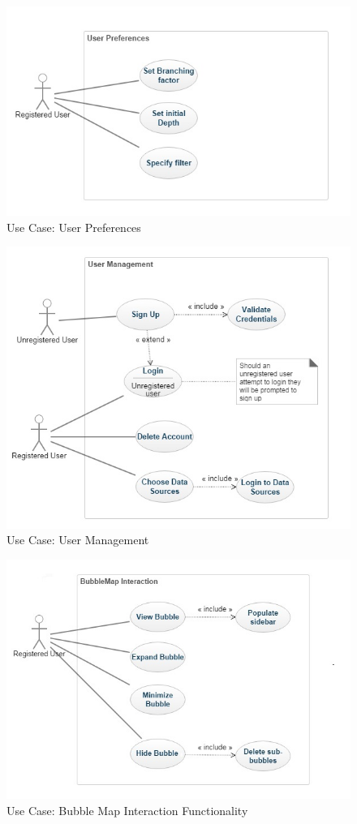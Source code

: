 \documentclass[hidelinks,english]{article}
\begin{document}
		\begin{figure}
		\includegraphics[width=\linewidth]{User Preferences.jpg}
		\caption{Use Case: User Preferences}
		\end{figure}
		\begin{figure}
			\includegraphics[width=\linewidth]{UserManagement.jpg}
			\caption{Use Case: User Management}
		\end{figure}
		\begin{figure}
			\includegraphics[width=\linewidth]{BubbleMap Interaction.jpg}
			\caption{Use Case: Bubble Map Interaction Functionality}
		\end{figure}
	
\end{document}
